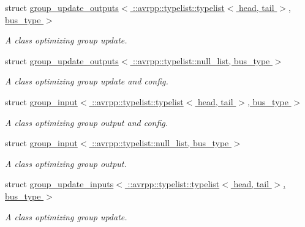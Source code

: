\begin{DoxyCompactItemize}
struct \hyperlink{structavrpp_1_1bus_1_1group__update__outputs_3_01_1_1avrpp_1_1typelist_1_1typelist_3_01head_00_01tail_01_4_00_01bus__type_01_4}{group\_\-update\_\-outputs$<$ ::avrpp::typelist::typelist$<$ head, tail $>$, bus\_\-type $>$}
\begin{DoxyCompactList}\small\item\em A class optimizing group update. \item\end{DoxyCompactList}\item 
struct \hyperlink{structavrpp_1_1bus_1_1group__update__outputs_3_01_1_1avrpp_1_1typelist_1_1null__list_00_01bus__type_01_4}{group\_\-update\_\-outputs$<$ ::avrpp::typelist::null\_\-list, bus\_\-type $>$}
\begin{DoxyCompactList}\small\item\em A class optimizing group update and config. \item\end{DoxyCompactList}\item 
struct \hyperlink{structavrpp_1_1bus_1_1group__input_3_01_1_1avrpp_1_1typelist_1_1typelist_3_01head_00_01tail_01_4_00_01bus__type_01_4}{group\_\-input$<$ ::avrpp::typelist::typelist$<$ head, tail $>$, bus\_\-type $>$}
\begin{DoxyCompactList}\small\item\em A class optimizing group output and config. \item\end{DoxyCompactList}\item 
struct \hyperlink{structavrpp_1_1bus_1_1group__input_3_01_1_1avrpp_1_1typelist_1_1null__list_00_01bus__type_01_4}{group\_\-input$<$ ::avrpp::typelist::null\_\-list, bus\_\-type $>$}
\begin{DoxyCompactList}\small\item\em A class optimizing group output. \item\end{DoxyCompactList}\item 
struct \hyperlink{structavrpp_1_1bus_1_1group__update__inputs_3_01_1_1avrpp_1_1typelist_1_1typelist_3_01head_00_01tail_01_4_00_01bus__type_01_4}{group\_\-update\_\-inputs$<$ ::avrpp::typelist::typelist$<$ head, tail $>$, bus\_\-type $>$}
\begin{DoxyCompactList}\small\item\em A class optimizing group update. \item\end{DoxyCompactList}\item 

\end{DoxyCompactItemize}
